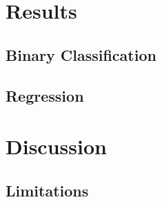 \documentclass[10pt]{article}
\begin{document}


\section{Results}


\subsection{Binary Classification}


\subsection{Regression}



\section{Discussion}


\subsection{Limitations}



\end{document}
